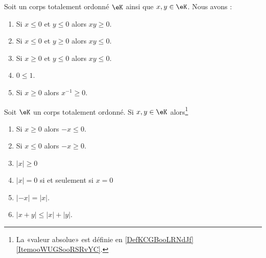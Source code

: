 \begin{lemma}        \label{LEMooXJTAooZauchx}
    Soit un corps totalement ordonné \( \eK\) ainsi que \( x,y\in \eK\). Nous avons :
    \begin{enumerate}
        \item
            Si \( x\leq 0\) et \( y\leq 0\) alors \( xy\geq 0\).
            \item
                Si \( x\leq 0\) et \( y\geq 0\) alors \( xy\leq 0\).
\item
    Si \( x\geq 0\) et \( y\leq 0\) alors \( xy\leq 0\).
\item       \label{ITEMooRGYAooCUIfss}
            \( 0\leq 1\).
        \item       \label{ITEMooMRNHooLglPKn}
            Si \( x\geq 0\) alors \( x^{-1}\geq 0\).
    \end{enumerate}
\end{lemma}

\begin{lemma}  \label{LemooANTJooYxQZDw}
    Soit \( \eK\) un corps totalement ordonné. Si \( x,y\in \eK\) alors\footnote{La «valeur absolue» est définie en \eqref{DefKCGBooLRNdJf}\ref{ItemooWUGSooRSRvYC}.}
    \begin{enumerate}
        \item       \label{ItemooNVDIooSuiSoB}
            Si \( x\geq 0\) alors \( -x\leq 0\).
        \item       \label{ITEMooVNAZooSxmtuH}
            Si \( x\leq 0\) alors \( -x\geq 0\).
        \item       \label{ITEMooSDNHooDnjScE}
            \( | x |\geq 0\)
        \item       \label{ITEMooLQLTooTJTPVM}
            \( | x |=0\) si et seulement si \( x=0\)
        \item       \label{ITEMooVJAEooOEatzY}
            \( | -x |=| x |\).
        \item\label{ItemooOMKNooRlanvk}
            \( | x+y |\leq | x |+| y |\).
    \end{enumerate}
\end{lemma}

